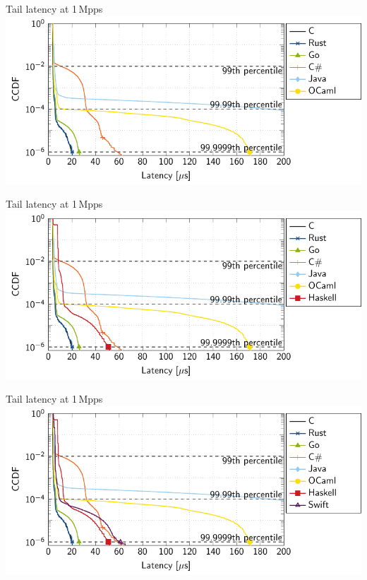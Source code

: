 \documentclass[NET,english,aspectratio=169,notitleframe]{tumbeamer}
\begin{document}
\begin{frame}{Tail latency at 1\,Mpps}
\hspace{1.7cm}\includegraphics[scale=1]{figures/latency-1/latency-ccdf-6.pdf}
\end{frame}
\addtocounter{framenumber}{-1}

\begin{frame}{Tail latency at 1\,Mpps}
\hspace{1.7cm}\includegraphics[scale=1]{figures/latency-1/latency-ccdf-7.pdf}
\end{frame}
\addtocounter{framenumber}{-1}

\begin{frame}{Tail latency at 1\,Mpps}
\hspace{1.7cm}\includegraphics[scale=1]{figures/latency-1/latency-ccdf-8.pdf}
\end{frame}
\addtocounter{framenumber}{-1}
\end{document}
